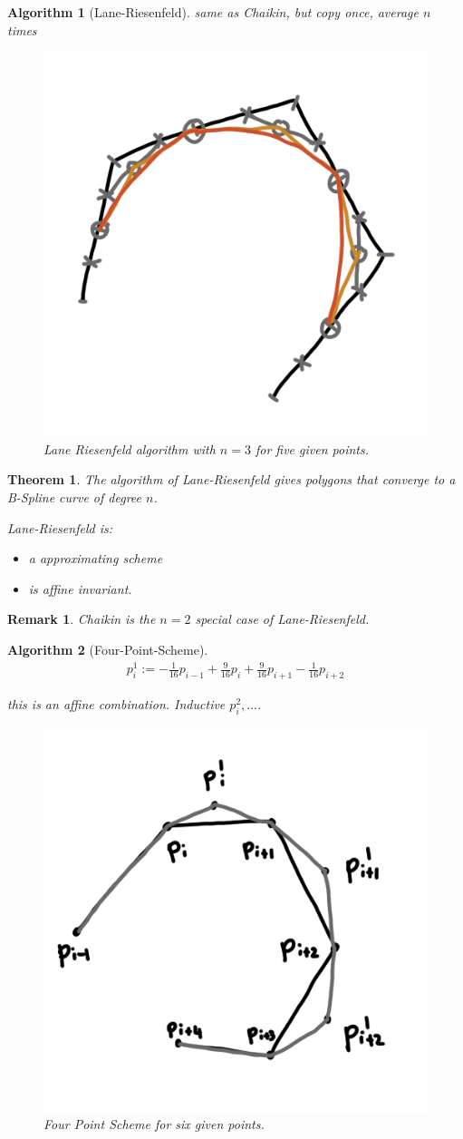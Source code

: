 \documentclass[]{article}
\newtheorem{theorem}{Theorem}
\newtheorem{algorithm}{Algorithm}
\newtheorem{remark}{Remark}
\begin{document}
\begin{algorithm}[Lane-Riesenfeld]
	same as Chaikin, but copy once, average $n$ times
	
	\begin{figure}[h!]
		\centering
		\includegraphics[width=0.3\linewidth]{figures/lane_riesenfeld}
		\caption{Lane Riesenfeld algorithm with $n=3$ for five given points.}
		\label{fig:lane_riesenfeld}
	\end{figure}
\end{algorithm}

\begin{theorem}
	The algorithm of Lane-Riesenfeld gives polygons that converge to a B-Spline curve of degree $n$.
	
	Lane-Riesenfeld is:
	\begin{itemize}
		\item a approximating scheme
		\item is affine invariant.
	\end{itemize}
\end{theorem}

\begin{remark}
	Chaikin is the $n=2$ special case of Lane-Riesenfeld.
\end{remark}

\begin{algorithm}[Four-Point-Scheme]
	\begin{align*}
		p_i^1 := -\frac{1}{16} p_{i-1} + \frac{9}{16} p_i + \frac{9}{16} p_{i+1} - \frac{1}{16} p_{i+2}
	\end{align*}
	
	this is an affine combination. Inductive $p_i^2, ...$.
	
	\begin{figure}[h!]
		\centering
		\includegraphics[width=0.3\linewidth]{figures/four_point_scheme}
		\caption{Four Point Scheme for six given points.}
		\label{fig:four_point_scheme}
	\end{figure}
\end{algorithm}
\end{document}
